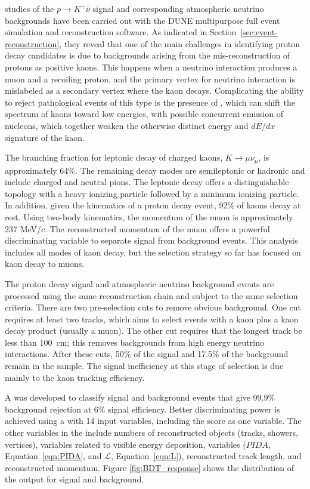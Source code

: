  studies of the $p\to K^+ \bar{\nu}$ signal and corresponding atmospheric neutrino backgrounds have been carried out with the DUNE multipurpose full event simulation and reconstruction software.  As indicated in Section~\ref{sec:event-reconstruction},
they reveal that one of the main challenges in identifying proton decay candidates is due to backgrounds arising from the mis-reconstruction of protons as positive kaons. This happens when a  neutrino interaction produces a muon and a recoiling proton, and the primary vertex for neutrino interaction is mislabeled as a secondary vertex where the kaon decays.  Complicating the ability to reject pathological events of this type is the presence of , which can shift the spectrum of kaons toward low energies, with possible concurrent emission of nucleons, which together weaken the otherwise distinct energy and $dE/dx$ signature of the kaon. 

The branching fraction for leptonic decay of charged kaons, $K\rightarrow \mu \nu_{\mu}$, is approximately 64$\%$. The remaining decay modes are semileptonic or hadronic and include charged and neutral pions. The leptonic decay offers a distinguishable topology with a heavy ionizing particle followed by a minimum ionizing particle. In addition, given the kinematics of a proton decay event, 92$\%$ of kaons decay at rest. Using two-body kinematics, the momentum of the muon is approximately 237 MeV/$c$. The reconstructed momentum of the muon offers a powerful discriminating variable to separate signal from background events.  This analysis includes all modes of kaon decay, but the selection strategy so far has focused on kaon decay to muons.

The proton decay signal and atmospheric neutrino background events are processed using the same reconstruction chain and subject to the same selection criteria. There are two pre-selection cuts to remove obvious background. One cut requires at least two tracks, which aims to select events with a kaon plus a kaon decay product (usually a muon).  The other cut requires that the longest track be less than 100~cm; this removes backgrounds from high energy neutrino interactions.  After these cuts, 50$\%$ of the signal and 17.5$\%$ of the background remain in the sample.  The signal inefficiency at this stage of selection is due mainly to the kaon tracking efficiency.

A  was developed to classify signal and background events that give 99.9\% background rejection at 6\% signal efficiency.  Better discriminating power is achieved using a  with 14 input variables, including the  score as one  variable.  The other variables in the  include numbers of reconstructed objects (tracks, showers, vertices), variables related to visible energy deposition,  variables ($PIDA$, Equation~\ref{eqn:PIDA}, and $\mathcal{L}$, Equation~\ref{eqn:L}), reconstructed track length, and reconstructed momentum.
Figure \ref{fig:BDT_response} shows the distribution of the  output for signal and background.

